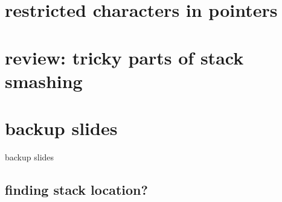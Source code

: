 \section{restricted characters in pointers}


\section{review: tricky parts of stack smashing}


\section{backup slides}
\begin{frame}{backup slides}
\end{frame}

\subsection{finding stack location?}


